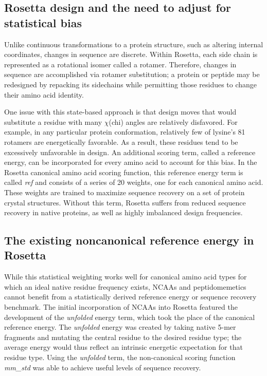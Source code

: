 \subsection{Rosetta design and the need to adjust for statistical bias}
Unlike continuous transformations to a protein structure, such as altering internal coordinates, changes in sequence are discrete.
Within Rosetta, each side chain is represented as a rotational isomer called a rotamer.
Therefore, changes in sequence are accomplished via rotamer substitution; a protein or peptide may be redesigned by repacking its sidechains while permitting those residues to change their amino acid identity\cite{leaver-fay_chapter_2011}.

One issue with this state-based approach is that design moves that would substitute a residue with many $\chi$(chi) angles are relatively disfavored. For example, in any particular protein conformation, relatively few of lysine's 81 rotamers are energetically favorable.
As a result, these residues tend to be excessively unfavorable in design\cite{leaver-fay_chapter_2013,rohl_protein_2004}.
An additional scoring term, called a reference energy, can be incorporated for every amino acid to account for this bias. 
In the Rosetta canonical amino acid scoring function, this reference energy term is called \textit{ref} and consists of a series of 20 weights, one for each canonical amino acid.
These weights are trained to maximize sequence recovery on a set of protein crystal structures.
Without this term, Rosetta suffers from reduced sequence recovery in native proteins, as well as highly imbalanced design frequencies\cite{rohl_protein_2004}.

\subsection{The existing noncanonical reference energy in Rosetta}

While this statistical weighting works well for canonical amino acid types for which an ideal native residue frequency exists, NCAAs and peptidomemetics cannot benefit from a statistically derived reference energy or sequence recovery benchmark.
The initial incorporation of NCAAs into Rosetta featured the development of the \textit{unfolded} energy term, which took the place of the canonical reference energy\cite{renfrew_incorporation_2012}.
The \textit{unfolded} energy was created by taking native 5-mer fragments and mutating the central residue to the desired residue type; the average energy would thus reflect an intrinsic energetic expectation for that residue type.
Using the \textit{unfolded} term, the non-canonical scoring function \textit{mm\_std} was able to achieve useful levels of sequence recovery.

